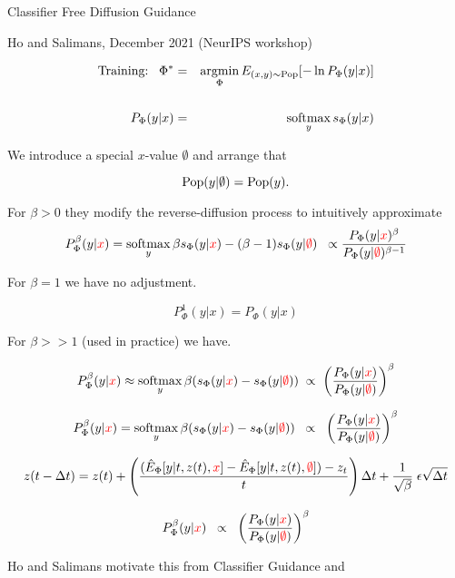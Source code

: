 {

\centerline{Classifier Free Diffusion Guidance}
\centerline{Ho and Salimans, December 2021 (NeurIPS workshop)}
\begin{eqnarray*}
\mbox{Training:}\;\;\;\Phi^* & = & \operatorname*{argmin}_\Phi E_{(x,y) \sim \mathrm{Pop}}[-\ln P_\Phi(y|x)] \\
\\
P_\Phi(y|x) & = & \operatorname*{softmax}_y s_\Phi(y|x)
\end{eqnarray*}

\vfill
We introduce a special $x$-value $\emptyset$ and arrange that

\vfill
{\color{red} $$\mathrm{Pop}(y|\emptyset) = \mathrm{Pop}(y).$$}


For $\beta > 0$ they modify the reverse-diffusion process to intuitively approximate
$$P^\beta_\Phi(y|{\color{red} x}) = \operatorname*{softmax}_y  \beta s_\Phi(y|{\color{red} x}) - (\beta-1)s_\Phi(y|{\color{red} \emptyset}) \;\;\propto
\frac{P_\Phi(y|{\color{red} x})^\beta}{P_\Phi(y|{\color{red} \emptyset})^{\beta-1}}$$

\vfill
For $\beta = 1$ we have no adjustment.

$$P^1_\Phi(y|x) = P_\Phi(y|x)$$

\vfill
For $\beta >> 1$ (used in practice) we have.

$$P^\beta_\Phi(y|{\color{red} x}) \approx \operatorname*{softmax}_y \beta(s_\Phi(y|{\color{red} x}) - s_\Phi(y|{\color{red} \emptyset})) \;\propto\; \left(\frac{P_\Phi(y|{\color{red} x})}{P_\Phi(y|{\color{red} \emptyset})}\right)^\beta$$



$$P^\beta_\Phi(y|{\color{red} x}) = \operatorname*{softmax}_y \beta(s_\Phi(y|{\color{red} x}) - s_\Phi(y|{\color{red} \emptyset}))\;\;\propto \;\;      \left(\frac{P_\Phi(y|{\color{red} x})}{P_\Phi(y|{\color{red} \emptyset})}\right)^\beta$$

\vfill

\vfill
{\huge $$z(t - \Delta t) = z(t) + \left(\frac{(\hat{E}_\Phi[y|t,z(t),{\color{red} x}] - \hat{E}_\Phi[y|t,z(t),{\color{red} \emptyset}]) - z_t}{t}\right)\Delta t
+ \frac{1}{\sqrt{\beta}}\;\epsilon\sqrt{\Delta t}$$}


$$P^\beta_\Phi(y|{\color{red} x}) \;\;\propto \;\;  \left(\frac{P_\Phi(y|{\color{red} x})}{P_\Phi(y|{\color{red} \emptyset})}\right)^\beta$$

\vfill
Ho and Salimans motivate this from Classifier Guidance and

}
